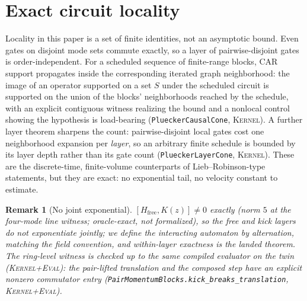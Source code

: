 \documentclass[11pt]{article}
\newcommand{\Kernel}{\textcolor{kernelcolor}{\textsc{Kernel}}}
\newcommand{\DraftTrust}{\textcolor{draftcolor}{\textsc{Kernel+Eval}}}
\newtheorem{remark}{Remark}
\begin{document}
\section{Exact circuit locality}

Locality in this paper is a set of finite identities, not an asymptotic
bound.  Even gates on disjoint mode sets commute exactly, so a layer of
pairwise-disjoint gates is order-independent.  For a scheduled sequence
of finite-range blocks, CAR support propagates inside the corresponding
iterated graph neighborhood: the image of an operator supported on a
set $S$ under the scheduled circuit is supported on the union of the
blocks' neighborhoods reached by the schedule, with an explicit
contiguous witness realizing the bound and a nonlocal control showing
the hypothesis is load-bearing (\texttt{PlueckerCausalCone}, \Kernel{}).
A further layer theorem sharpens the count: pairwise-disjoint local
gates cost one neighborhood expansion per \emph{layer}, so an arbitrary
finite schedule is bounded by its layer depth rather than its gate
count (\texttt{PlueckerLayerCone}, \Kernel{}).  These are the
discrete-time, finite-volume counterparts of Lieb--Robinson-type
statements, but they are exact: no exponential tail, no velocity
constant to estimate.

\begin{remark}[No joint exponential]
$[H_{\mathrm{free}},K(z)]\neq0$ exactly (norm $5$ at the four-mode line
witness; oracle-exact, not formalized), so the free and kick layers do
not exponentiate jointly; we \emph{define} the interacting automaton by
alternation, matching the field convention, and within-layer exactness
is the landed theorem.  The ring-level witness is checked up to the same
compiled evaluator on the twin (\DraftTrust):
the pair-lifted translation and the composed step have an explicit
nonzero commutator entry
(\texttt{PairMomentumBlocks.kick\_breaks\_translation}, \DraftTrust{}).
\end{remark}
\end{document}
